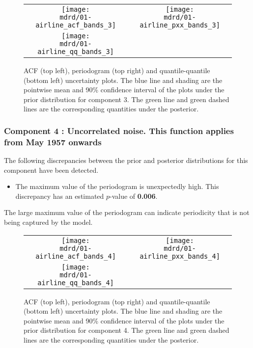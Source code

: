 \documentclass{article} %
\begin{document}
\begin{figure}[H]
\newcommand{\wmgd}{0.5\columnwidth}
\newcommand{\hmgd}{3.0cm}
\newcommand{\mdrd}{01-airline}
\newcommand{\mbm}{\hspace{-0.3cm}}
\begin{tabular}{cc}
\mbm \texttt{[image: \\mdrd/01-airline\_acf\_bands\_3]} & \texttt{[image: \\mdrd/01-airline\_pxx\_bands\_3]} \\
\mbm \texttt{[image: \\mdrd/01-airline\_qq\_bands\_3]}
\end{tabular}
\caption{
ACF (top left), periodogram (top right) and quantile-quantile (bottom left) uncertainty plots.
The blue line and shading are the pointwise mean and 90\% confidence interval of the plots under the prior distribution for component 3.
The green line and green dashed lines are the corresponding quantities under the posterior.}
\label{fig:check3}
\end{figure}

\subsubsection{Component 4 : Uncorrelated noise. This function applies from May 1957 onwards}


The following discrepancies between the prior and posterior distributions for this component have been detected.

\begin{itemize}

    \item The maximum value of the periodogram is unexpectedly high. This discrepancy has an estimated $p$-value of \textbf{0.006}.
\end{itemize}

The large maximum value of the periodogram can indicate periodicity that is not being captured by the model.


\begin{figure}[H]
\newcommand{\wmgd}{0.5\columnwidth}
\newcommand{\hmgd}{3.0cm}
\newcommand{\mdrd}{01-airline}
\newcommand{\mbm}{\hspace{-0.3cm}}
\begin{tabular}{cc}
\mbm \texttt{[image: \\mdrd/01-airline\_acf\_bands\_4]} & \texttt{[image: \\mdrd/01-airline\_pxx\_bands\_4]} \\
\mbm \texttt{[image: \\mdrd/01-airline\_qq\_bands\_4]}
\end{tabular}
\caption{
ACF (top left), periodogram (top right) and quantile-quantile (bottom left) uncertainty plots.
The blue line and shading are the pointwise mean and 90\% confidence interval of the plots under the prior distribution for component 4.
The green line and green dashed lines are the corresponding quantities under the posterior.}
\label{fig:check4}
\end{figure}
\end{document}
